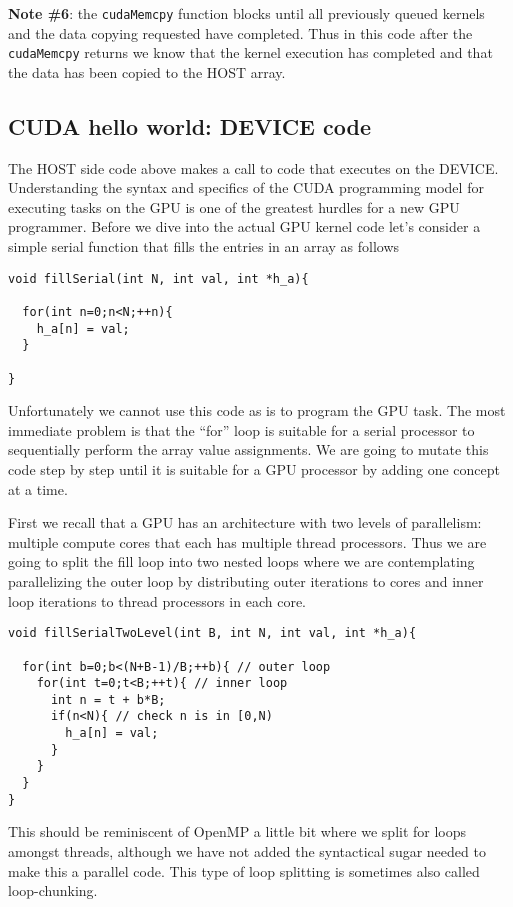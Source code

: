 {\bf Note \#6}: the \texttt{cudaMemcpy} function blocks until all previously queued kernels and the data copying requested have completed. Thus in this code after the \texttt{cudaMemcpy} returns we know that the kernel execution has completed and that the data has been copied to the HOST array.


\subsection{CUDA hello world: DEVICE code}

The HOST side code above makes a call to code that executes on the DEVICE. Understanding the syntax and specifics of the CUDA programming model for executing tasks on the GPU is one of the greatest hurdles for a new GPU programmer.  Before we dive into the actual GPU kernel code let's consider a simple serial function that fills the entries in an array as follows
\begin{verbatim}
void fillSerial(int N, int val, int *h_a){

  for(int n=0;n<N;++n){
    h_a[n] = val;
  }

}
\end{verbatim}
Unfortunately we cannot use this code as is to program the GPU task. The most immediate problem is that the ``for'' loop is suitable for a serial processor to sequentially perform the array value assignments. We are going to mutate this code step by step until it is suitable for a GPU processor by adding one concept at a time. 

First we recall that a GPU has an architecture with two levels of parallelism: multiple compute cores that each has multiple thread processors. Thus we are going to split the fill loop into two nested loops where we are contemplating parallelizing the outer loop by distributing outer iterations to cores and inner loop iterations to thread processors in each core.
\begin{verbatim}
void fillSerialTwoLevel(int B, int N, int val, int *h_a){

  for(int b=0;b<(N+B-1)/B;++b){ // outer loop
    for(int t=0;t<B;++t){ // inner loop
      int n = t + b*B;
      if(n<N){ // check n is in [0,N)
        h_a[n] = val;
      }
    }
  }
}
\end{verbatim}
This should be reminiscent of OpenMP a little bit where we split for loops amongst threads, although we have not added the syntactical sugar needed to make this a parallel code. This type of loop splitting is sometimes also called loop-chunking. 

